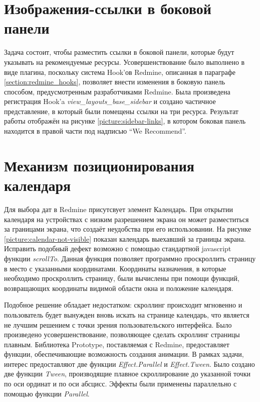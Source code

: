 \section{Изображения-ссылки в боковой панели}
Задача состоит, чтобы разместить ссылки в боковой панели, которые будут
указывать на рекомендуемые ресурсы. Усовершенствование было выполнено в виде
плагина, поскольку система Hook'ов Redmine, описанная в параграфе
\ref{section:redmine_hooks}, позволяет внести изменения в боковую панель
способом, предусмотренным разработчиками Redmine. Была произведена регистрация
Hook'a \textit{view\_layouts\_base\_sidebar} и создано частичное представление,
в который были помещены ссылки на три ресурса. Результат работы отображён на
рисунке \ref{picture:sidebar-links}, в котором боковая панель находится в
правой части под надписью ``We Recommend''.


\section{Механизм позиционирования календаря}
Для выбора дат в Redmine присутсвует элемент Календарь. При открытии календаря
на устройствах с низким разрешением экрана он может разместиться за границами
экрана, что создаёт неудобства при его использовании. На рисунке
\ref{picture:calendar-not-visible} показан календарь выехавший за границы
экрана. Исправить подобный дефект возможно с помощью стандартной javascript
функции \textit{scrollTo}. Данная функция позволяет программно проскроллить
страницу в место с указанными координатами. Координаты назначения, в которые
необходимо проскроллить страницу, были вычислены при помощи функций,
возвращающих координаты видимой области окна и положение календаря.

Подобное решение обладает недостатком: скроллинг происходит мгновенно и
пользователь будет вынужден вновь искать на странице календарь, что является не
лучшим решением с точки зрения пользовательского интерфейса. Было произведено
усовершенствование, позволяющее сделать скроллинг страницы плавным.
Библиотека Prototype, поставляемая с Redmine, предоставляет функции,
обеспечивающие возможность создания анимации. В рамках задачи, интерес
предоставляют две функции \textit{Effect.Parallel} и \textit{Effect.Tween}.
Было создано две функции \textit{Tween}, производящие плавное скроллирование до
указанной точки по оси ординат и по оси абсцисс. Эффекты были применены
параллельно с помощью функции \textit{Parallel}.

